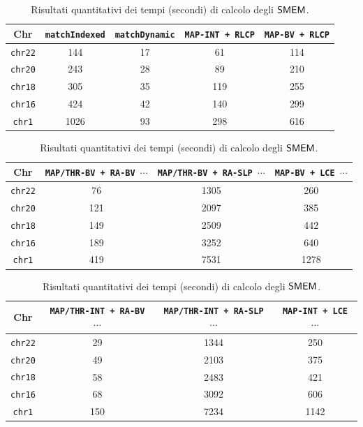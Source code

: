 \begin{table}
  \centering
  \caption{Risultati quantitativi dei tempi (secondi) di calcolo degli
    $\mbox{\rm {\sf SMEM}}$.}  
  \label{tab:exetime}
  \footnotesize
  \begin{tabular}{c||c|c|c|c} 
    \textbf{Chr}
    & \textbf{\texttt{matchIndexed}}
    & \textbf{\texttt{matchDynamic}}
    & \textbf{\texttt{MAP-INT + RLCP}}
    & \textbf{\texttt{MAP-BV + RLCP}}\\
    \hline
    \hline
    \texttt{chr22} & 144 & 17 & 61 & 114 \\
    \texttt{chr20} & 243 & 28 & 89 & 210 \\
    \texttt{chr18} & 305 & 35 & 119 & 255 \\
    \texttt{chr16} & 424 & 42 & 140 & 299 \\
    \texttt{chr1} & 1026 & 93 & 298 & 616
  \end{tabular}
  \vspace{+3mm}
  \vspace{+1mm}
  \begin{tabular}{c||c|c|c} 
    \textbf{Chr}
    & \textbf{\texttt{MAP/THR-BV + RA-BV $\cdots$}}
    & \textbf{\texttt{MAP/THR-BV + RA-SLP $\cdots$}}
    & \textbf{\texttt{MAP-BV + LCE $\cdots$}}\\
    \hline
    \hline
    \texttt{chr22} & 76 & 1305 & 260 \\
    \texttt{chr20} & 121 & 2097 & 385  \\
    \texttt{chr18} & 149 & 2509 & 442  \\
    \texttt{chr16} & 189 & 3252 & 640 \\
    \texttt{chr1} & 419 & 7531 & 1278 
  \end{tabular}
  \vspace{+3mm}
  \vspace{+1mm}
  \begin{tabular}{c||c|c|c} 
    \textbf{Chr}
    & \textbf{\texttt{MAP/THR-INT + RA-BV $\cdots$}}
    & \textbf{\texttt{MAP/THR-INT + RA-SLP $\cdots$}}
    & \textbf{\texttt{MAP-INT + LCE $\cdots$}}\\
    \hline
    \hline
    \texttt{chr22} & 29 & 1344 & 250 \\
    \texttt{chr20} & 49 & 2103 & 375 \\
    \texttt{chr18} & 58 & 2483 & 421 \\
    \texttt{chr16} & 68 & 3092 & 606 \\
    \texttt{chr1} & 150 & 7234 & 1142

  \end{tabular}
\end{table}

